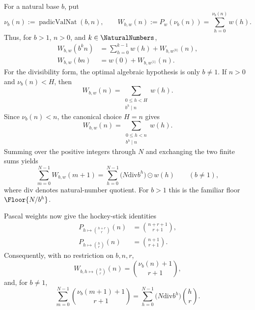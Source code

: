 \documentclass[11pt,oneside]{article}
\theoremstyle{definition}
\theoremstyle{remark}
\begin{document}
For a natural base \(b\), put
\begin{equation}
 \nu_b(n):=\operatorname{padicValNat}(b,n),\qquad
 W_{b,w}(n):=P_w(\nu_b(n))
            =\sum_{h=0}^{\nu_b(n)}w(h).                  \label{eq:weighted-scale-multiplicity}
\end{equation}
Thus, for \(b>1\), \(n>0\), and \(k\in\NaturalNumbers\),
\begin{align}
 W_{b,w}(b^kn)
   &=\sum_{h=0}^{k-1}w(h)+W_{b,w^{\langle k\rangle}}(n), \label{eq:weighted-scale-shift}\\
 W_{b,w}(bn)
   &=w(0)+W_{b,w^{\langle1\rangle}}(n).                 \label{eq:weighted-scale-one-shift}
\end{align}
For the divisibility form, the optimal algebraic hypothesis is only
\(b\ne1\).  If \(n>0\) and \(\nu_b(n)<H\), then
\begin{equation}
 W_{b,w}(n)=\sum_{\substack{0\le h<H\\b^h\mid n}}w(h).  \label{eq:weighted-scale-divisors-bounded}
\end{equation}
Since \(\nu_b(n)<n\), the canonical choice \(H=n\) gives
\begin{equation}
 W_{b,w}(n)=\sum_{\substack{0\le h<n\\b^h\mid n}}w(h).  \label{eq:weighted-scale-divisors}
\end{equation}
Summing over the positive integers through \(N\) and exchanging the two
finite sums yields
\begin{equation}
 \sum_{m=0}^{N-1}W_{b,w}(m+1)
 =\sum_{h=0}^{N-1}\bigl(N\mathbin{\mathrm{div}}b^h\bigr)\odot w(h)
 \qquad(b\ne1),                                         \label{eq:weighted-scale-cumulative}
\end{equation}
where \(\mathrm{div}\) denotes natural-number quotient.  For \(b>1\) this
is the familiar floor \(\Floor{N/b^h}\).

Pascal weights now give the hockey-stick identities
\begin{align}
 P_{h\mapsto\binom{h+r}{r}}(n)&=\binom{n+r+1}{r+1},      \label{eq:weighted-prefix-shifted-pascal}\\
 P_{h\mapsto\binom hr}(n)&=\binom{n+1}{r+1}.             \label{eq:weighted-prefix-pascal}
\end{align}
Consequently, with no restriction on \(b,n,r\),
\begin{equation}
 W_{b,h\mapsto\binom hr}(n)
 =\binom{\nu_b(n)+1}{r+1},                              \label{eq:weighted-scale-pascal}
\end{equation}
and, for \(b\ne1\),
\begin{equation}
 \sum_{m=0}^{N-1}\binom{\nu_b(m+1)+1}{r+1}
 =\sum_{h=0}^{N-1}\bigl(N\mathbin{\mathrm{div}}b^h\bigr)\binom hr.
                                                               \label{eq:weighted-scale-pascal-cumulative}
\end{equation}
\end{document}
